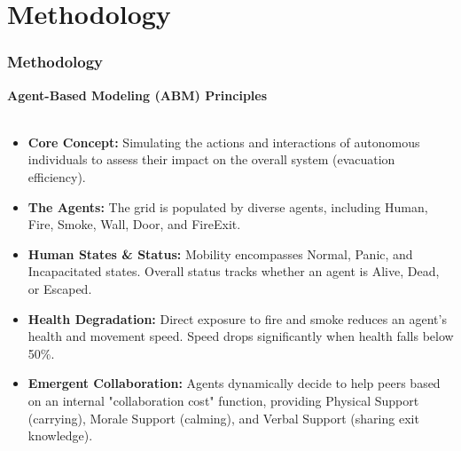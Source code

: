 \documentclass{beamer}
\begin{document}
\section{Methodology}

\begin{frame}
\frametitle{Methodology}
\textbf{Agent-Based Modeling (ABM) Principles} \\
\vspace{0.2cm}
\footnotesize 

\begin{itemize}
    \item \textbf{Core Concept:} Simulating the actions and interactions of autonomous individuals to assess their impact on the overall system (evacuation efficiency).
    \item \textbf{The Agents:} The grid is populated by diverse agents, including Human, Fire, Smoke, Wall, Door, and FireExit.
    \item \textbf{Human States \& Status:} Mobility encompasses Normal, Panic, and Incapacitated states. Overall status tracks whether an agent is Alive, Dead, or Escaped.
    \item \textbf{Health Degradation:} Direct exposure to fire and smoke reduces an agent's health and movement speed. Speed drops significantly when health falls below 50\%.
    \item \textbf{Emergent Collaboration:} Agents dynamically decide to help peers based on an internal "collaboration cost" function, providing Physical Support (carrying), Morale Support (calming), and Verbal Support (sharing exit knowledge).
\end{itemize}
\end{frame}
\end{document}
